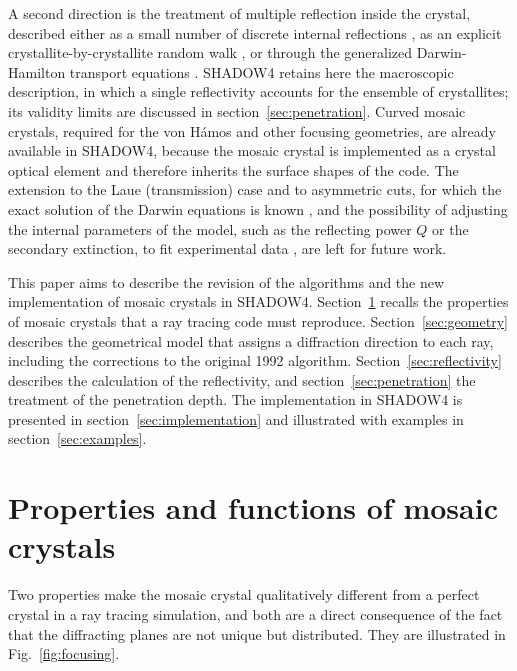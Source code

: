 \documentclass{iucr}
\begin{document}
A second direction is the treatment of multiple reflection inside the crystal,
described either as a small number of discrete internal reflections
\cite{Schlesiger2017}, as an explicit crystallite-by-crystallite random walk
\cite{Alianelli2004, Pablant2024, Gawne2026}, or through the generalized
Darwin-Hamilton transport equations \cite{Wuttke2014, Bornemann2020}. SHADOW4
retains here the macroscopic description, in which a single reflectivity accounts
for the ensemble of crystallites; its validity limits are discussed in
section~\ref{sec:penetration}. Curved mosaic crystals, required for the von H\'amos
and other focusing geometries, are already available in SHADOW4, because the mosaic
crystal is implemented as a crystal optical element and therefore inherits the
surface shapes of the code. The extension to the Laue (transmission) case and to
asymmetric cuts, for which the exact solution of the Darwin equations is known
\cite{Sears1997a}, and the possibility of adjusting the internal parameters of the
model, such as the reflecting power $Q$ or the secondary extinction, to fit
experimental data \cite{Alianelli2001}, are left for future work.

This paper aims to describe the revision of the algorithms and the new
implementation of mosaic crystals in SHADOW4. Section~\ref{sec:properties} recalls
the properties of mosaic crystals that a ray tracing code must reproduce.
Section~\ref{sec:geometry} describes the geometrical model that assigns a
diffraction direction to each ray, including the corrections to the original 1992
algorithm. Section~\ref{sec:reflectivity} describes the calculation of the
reflectivity, and section~\ref{sec:penetration} the treatment of the penetration
depth. The implementation in SHADOW4 is presented in
section~\ref{sec:implementation} and illustrated with examples in
section~\ref{sec:examples}.


\section{Properties and functions of mosaic crystals}
\label{sec:properties}

Two properties make the mosaic crystal qualitatively different from a perfect
crystal in a ray tracing simulation, and both are a direct consequence of the fact
that the diffracting planes are not unique but distributed. They are illustrated in
Fig.~\ref{fig:focusing}.
\end{document}
